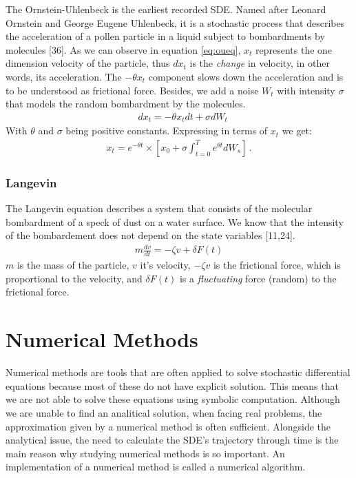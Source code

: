 \documentclass[12pt,twoside]{reedthesis}
\theoremstyle{definition}
\theoremstyle{definition}
\theoremstyle{remark}
\begin{document}
  The Ornstein-Uhlenbeck is the earliest recorded SDE. Named after Leonard
  Ornstein and George Eugene Uhlenbeck, it is a stochastic process that
  describes the acceleration of a pollen particle in a liquid subject to
  bombardments by molecules {[}36{]}. As we can observe in equation
  \eqref{eq:oueq}, \(x_t\) represents the one dimension velocity of the
  particle, thus \(dx_t\) is the \emph{change} in velocity, in other
  words, its acceleration. The \(- \theta x_t\) component slows down the
  acceleration and is to be understood as frictional force. Besides, we
  add a noise \(W_t\) with intensity \(\sigma\) that models the random
  bombardment by the molecules.
  \begin{align} 
  \label{eq:oueq}
  &d x_t = - \theta x_t dt + \sigma d W_t
  \end{align}
  With \(\theta\) and \(\sigma\) being positive constants. Expressing in
  terms of \(x_t\) we get:
  \begin{align}
  x_t = e^{-\theta t} \times \left[ x_0  + \sigma \int_{t=0}^{T} e^{\theta t} d W_s \right] \,.
  \end{align}
  \subsubsection{Langevin}\label{langevin}
  
  The Langevin equation describes a system that consists of the molecular
  bombardment of a speck of dust on a water surface. We know that the
  intensity of the bombardement does not depend on the state variables
  {[}11,24{]}.
  \begin{align}
  m \frac{dv}{dt} = -\zeta v + \delta F (t) 
  \end{align}
  \(m\) is the mass of the particle, \(v\) it's velocity, \(-\zeta v\) is
  the frictional force, which is proportional to the velocity, and
  \(\delta F (t)\) is a \emph{fluctuating} force (random) to the
  frictional force.
  
  \section{Numerical Methods}\label{numerical-methods}
  
  Numerical methods are tools that are often applied to solve stochastic
  differential equations because most of these do not have explicit
  solution. This means that we are not able to solve these equations using
  symbolic computation. Although we are unable to find an analitical
  solution, when facing real problems, the approximation given by a
  numerical method is often sufficient. Alongside the analytical issue,
  the need to calculate the SDE's trajectory through time is the main
  reason why studying numerical methods is so important. An implementation
  of a numerical method is called a numerical algorithm.
  
\end{document}
